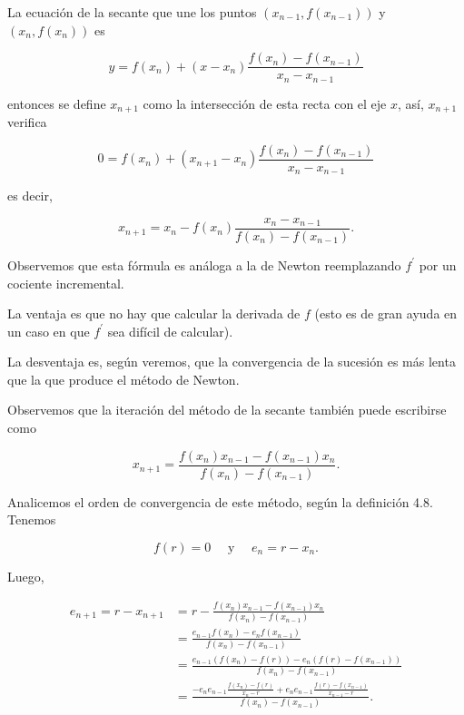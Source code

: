 \documentclass[10pt]{article}
\begin{document}
La ecuación de la secante que une los puntos $\left(x_{n-1}, f\left(x_{n-1}\right)\right)$ y $\left(x_{n}, f\left(x_{n}\right)\right)$ es

$$
y=f\left(x_{n}\right)+\left(x-x_{n}\right) \frac{f\left(x_{n}\right)-f\left(x_{n-1}\right)}{x_{n}-x_{n-1}}
$$

entonces se define $x_{n+1}$ como la intersección de esta recta con el eje $x$, así, $x_{n+1}$ verifica

$$
0=f\left(x_{n}\right)+\left(x_{n+1}-x_{n}\right) \frac{f\left(x_{n}\right)-f\left(x_{n-1}\right)}{x_{n}-x_{n-1}}
$$

es decir,

$$
x_{n+1}=x_{n}-f\left(x_{n}\right) \frac{x_{n}-x_{n-1}}{f\left(x_{n}\right)-f\left(x_{n-1}\right)} .
$$

Observemos que esta fórmula es análoga a la de Newton reemplazando $f^{\prime}$ por un cociente incremental.

La ventaja es que no hay que calcular la derivada de $f$ (esto es de gran ayuda en un caso en que $f^{\prime}$ sea difícil de calcular).

La desventaja es, según veremos, que la convergencia de la sucesión es más lenta que la que produce el método de Newton.

Observemos que la iteración del método de la secante también puede escribirse como

$$
x_{n+1}=\frac{f\left(x_{n}\right) x_{n-1}-f\left(x_{n-1}\right) x_{n}}{f\left(x_{n}\right)-f\left(x_{n-1}\right)} .
$$

Analicemos el orden de convergencia de este método, según la definición 4.8. Tenemos

$$
f(r)=0 \quad \text { y } \quad e_{n}=r-x_{n} .
$$

Luego,

$$
\begin{aligned}
e_{n+1}=r-x_{n+1} & =r-\frac{f\left(x_{n}\right) x_{n-1}-f\left(x_{n-1}\right) x_{n}}{f\left(x_{n}\right)-f\left(x_{n-1}\right)} \\
& =\frac{e_{n-1} f\left(x_{n}\right)-e_{n} f\left(x_{n-1}\right)}{f\left(x_{n}\right)-f\left(x_{n-1}\right)} \\
& =\frac{e_{n-1}\left(f\left(x_{n}\right)-f(r)\right)-e_{n}\left(f(r)-f\left(x_{n-1}\right)\right)}{f\left(x_{n}\right)-f\left(x_{n-1}\right)} \\
& =\frac{-e_{n} e_{n-1} \frac{f\left(x_{n}\right)-f(r)}{x_{n}-r}+e_{n} e_{n-1} \frac{f(r)-f\left(x_{n-1}\right)}{x_{n-1}-r}}{f\left(x_{n}\right)-f\left(x_{n-1}\right)} .
\end{aligned}
$$
\end{document}
